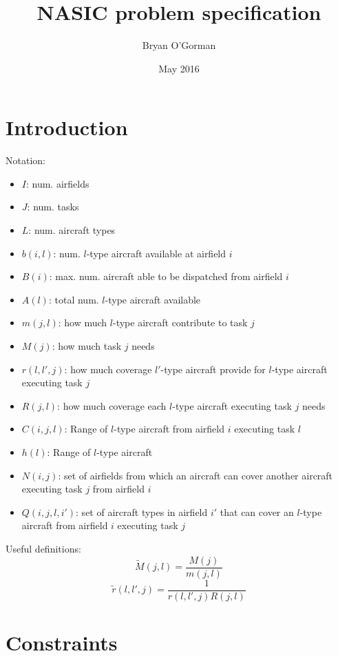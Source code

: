 \documentclass{article}
\title{NASIC problem specification}
\author{Bryan O'Gorman}
\date{May 2016}
\begin{document}
\maketitle

\section{Introduction}
Notation:
\begin{itemize}
    \item $I$: num. airfields
    \item $J$: num. tasks
    \item $L$: num. aircraft types
    \item $b(i, l)$: num. $l$-type aircraft available at airfield $i$
    \item $B(i)$: max. num. aircraft able to be dispatched from airfield $i$
    \item $A(l)$: total num. $l$-type aircraft available
    \item $m(j, l)$: how much $l$-type aircraft contribute to task $j$
    \item $M(j)$: how much task $j$ needs
    \item $r(l, l', j)$: how much coverage $l'$-type aircraft provide for $l$-type aircraft executing task $j$
    \item $R(j, l)$: how much coverage each $l$-type aircraft executing task $j$ needs
    \item $C(i, j, l)$: Range of $l$-type aircraft from airfield $i$ executing task $l$
    \item $h(l)$: Range of $l$-type aircraft
    \item $N(i, j)$: set of airfields from which an aircraft can cover another aircraft executing task $j$ from airfield $i$  
    \item $Q(i, j, l, i')$: set of aircraft types in airfield $i'$ that can cover an $l$-type aircraft from airfield $i$ executing task $j$
\end{itemize}

\noindent
Useful definitions: 
\begin{equation*}
    \tilde M(j, l) = \frac{M(j)}{m(j, l)}
\end{equation*}
\begin{equation*}
    \tilde r(l, l', j) = \frac{1}{r(l, l', j) R(j, l)}
\end{equation*}

\section{Constraints}
\end{document}
